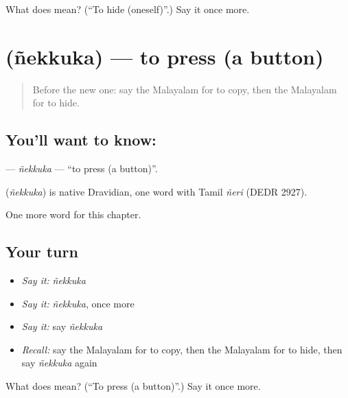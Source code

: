 \begin{tcolorbox}[breakable,colback=teal!4,colframe=teal!35!black,title={Before you move on}]
What does  mean? (\textquotedblleft{}To hide (oneself)\textquotedblright{}.) Say it once more.
\end{tcolorbox}
\section[\texorpdfstring{\ml{ഞെക്കുക} (ñekkuka)}{ഞെക്കുക (ñekkuka)}]{ (ñekkuka) — to press (a button)}

\label{lesson:ML-C190-nekkuka}



\begin{quote}
Before the new one: say the Malayalam for to copy, then the Malayalam for to hide.
\end{quote}

\subsection*{You'll want to know: }
\textbf{} — \emph{ñekkuka} — \textquotedblleft{}to press (a button)\textquotedblright{}.

\begin{cousinweb}
\textbf{} (\emph{ñekkuka}) is native Dravidian, one word with Tamil \emph{ñeri} (DEDR 2927).
\end{cousinweb}

\begin{grammarlens}[title={What you've built}]
One more word for this chapter.
\end{grammarlens}

\subsection*{Your turn}
\begin{itemize}
\raggedright
  \item \emph{Say it:} \emph{ñekkuka}
  \item \emph{Say it:} \emph{ñekkuka}, once more
  \item \emph{Say it:} say \emph{ñekkuka}
  \item \emph{Recall:} say the Malayalam for to copy, then the Malayalam for to hide, then say \emph{ñekkuka} again
\end{itemize}

\begin{tcolorbox}[breakable,colback=teal!4,colframe=teal!35!black,title={Before you move on}]
What does  mean? (\textquotedblleft{}To press (a button)\textquotedblright{}.) Say it once more.
\end{tcolorbox}

